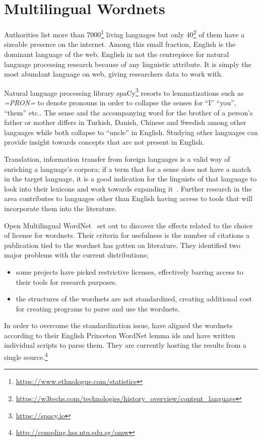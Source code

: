 \section{Multilingual Wordnets}%
\label{sec:multilingual_wordnets}
Authorities list more than 7000\footnote{\url{https://www.ethnologue.com/statistics}} living languages but only 40\footnote{\url{https://w3techs.com/technologies/history_overview/content_language}} of them have a sizeable presence on the internet.
Among this small fraction, English is the dominant language of the web.
English in not the centrepiece for natural language processing research because of any linguistic attribute.
It is simply the most abundant language on web, giving researchers data to work with.

Natural language processing library spaCy\footnote{\url{https://spacy.io}} resorts to lemmatizations such as \emph{=PRON=} to denote pronouns in order to collapse the senses for \enquote{I} \enquote{you}, \enquote{them} etc.\@.
The sense and the accompanying word for the brother of a person's father or mother differs in Turkish, Danish, Chinese and Swedish among other languages while both collapse to \enquote{uncle} in English.
Studying other languages can provide insight towards concepts that are not present in English.

Translation, information transfer from foreign languages is a valid way of enriching a language's corpora; if a term that for a sense does not have a match in the target language, it is a good indication for the linguists of that language to look into their lexicons and work towards expanding it~\cite{ibrahim_usta_turkce_2006}.
Further research in the area contributes to languages other than English having access to tools that will incorporate them into the literature.

Open Multilingual WordNet~\cite{bond_survey_2012, bond_linking_2013} set out to discover the effects related to the choice of license for wordnets.
Their criteria for usefulness is the number of citations a publication tied to the wordnet has gotten on literature.
They identified two major problems with the current distributions;
\begin{itemize}
    \item some projects have picked restrictive licenses, effectively barring access to their tools for research purposes.
    \item the structures of the wordnets are not standardized, creating additional cost for creating programs to parse and use the wordnets.
\end{itemize}
In order to overcome the standardization issue, \citeauthor{bond_survey_2012} have aligned the wordnets according to their English Princeton WordNet lemma ids and have written individual scripts to parse them.
They are currently hosting the results from a single source.\footnote{\url{http://compling.hss.ntu.edu.sg/omw}}


